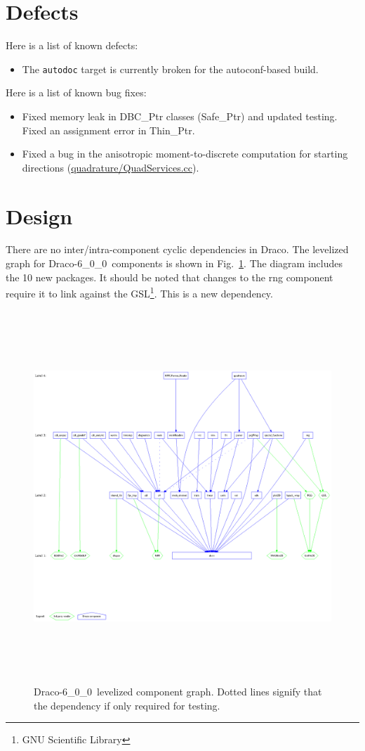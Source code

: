 \documentclass[note]{ResearchNote}
\newcommand{\draco}{Draco}
\newcommand{\dracor}{\draco-6\_0\_0}
\begin{document}
\section{Defects}
Here is a list of known defects:
\begin{itemize}
\item The \texttt{autodoc} target is currently broken for the
  autoconf-based build.
\end{itemize}

\noindent Here is a list of known bug fixes:
\begin{itemize}
\item Fixed memory leak in \textsf{DBC\_Ptr} classes
  (\textsf{Safe\_Ptr}) and updated testing.  Fixed an assignment error
  in \textsf{Thin\_Ptr}.
\item Fixed a bug in the anisotropic moment-to-discrete computation
  for starting directions (\url{quadrature/QuadServices.cc}).
\end{itemize}


\section{Design}

There are no inter/intra-component cyclic dependencies in \draco.  The
levelized graph for \dracor\ components is shown in
Fig.~\ref{fig:level}.  The diagram includes the 10 new packages.  It
should be noted that changes to the \textsf{rng} component require it
to link against the \textsf{GSL}\footnote{GNU Scientific Library}.
This is a new dependency.
\begin{figure}
  \label{fig:level}
  \centerline{
    \includegraphics[height=5.5in]{level-6_0_0.ps}}
  \caption{\dracor\ levelized component graph.  Dotted lines signify
    that the dependency if only required for testing.}
\end{figure}
\end{document}

